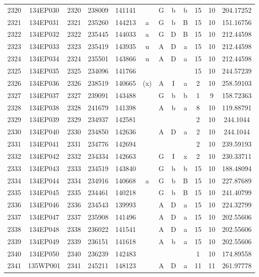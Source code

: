 \begin{tabular}{|*{12}{c|}}
2320 & 134EP030 & 2320 & 238009 & 141141 &  & G & b & b & 15 & 10 & 204.17252 \\ 
2321 & 134EP031 & 2321 & 235260 & 144213 & a & G & b & B & 15 & 10 & 151.16756 \\ 
2322 & 134EP032 & 2322 & 235445 & 144033 & a & G & D & B & 15 & 10 & 212.44598 \\ 
2323 & 134EP033 & 2323 & 235419 & 143935 & u & A & D & a & 15 & 10 & 212.44598 \\ 
2324 & 134EP034 & 2324 & 235501 & 143866 & u & A & D & a & 15 & 10 & 212.44598 \\ 
2325 & 134EP035 & 2325 & 234096 & 141766 &  &  &  &  & 15 & 10 & 244.57239 \\ 
2326 & 134EP036 & 2326 & 238519 & 140665 & (x) & A & I & a & 2 & 10 & 258.59103 \\ 
2327 & 134EP037 & 2327 & 239091 & 143488 &  & G & b & b & 1 & 9 & 158.72363 \\ 
2328 & 134EP038 & 2328 & 241679 & 141398 &  & A & b & a & 8 & 10 & 119.88791 \\ 
2329 & 134EP039 & 2329 & 234937 & 142581 &  &  &  &  & 2 & 10 & 244.1044 \\ 
2330 & 134EP040 & 2330 & 234850 & 142636 &  & A & D & a & 2 & 10 & 244.1044 \\ 
2331 & 134EP041 & 2331 & 234776 & 142694 &  &  &  &  & 2 & 10 & 239.59193 \\ 
2332 & 134EP042 & 2332 & 234334 & 142663 &  & G & I & x & 2 & 10 & 230.33711 \\ 
2333 & 134EP043 & 2333 & 234519 & 143840 &  & G & b & b & 15 & 10 & 188.48094 \\ 
2334 & 134EP044 & 2334 & 234916 & 140668 & a & G & b & B & 15 & 10 & 227.87689 \\ 
2335 & 134EP045 & 2335 & 234461 & 140218 &  & G & b & B & 15 & 10 & 241.40799 \\ 
2336 & 134EP046 & 2336 & 234543 & 139993 &  & A & D & a & 15 & 10 & 224.32799 \\ 
2337 & 134EP047 & 2337 & 235908 & 141496 &  & A & D & a & 15 & 10 & 202.55606 \\ 
2338 & 134EP048 & 2338 & 236022 & 141541 &  & A & D & a & 15 & 10 & 202.55606 \\ 
2339 & 134EP049 & 2339 & 236151 & 141618 &  & A & b & a & 15 & 10 & 202.55606 \\ 
2340 & 134EP050 & 2340 & 236239 & 142483 &  &  &  &  & 1 & 10 & 174.89558 \\ 
2341 & 135WP001 & 2341 & 245211 & 148123 &  & A & D & a & 11 & 11 & 261.97778 \\ 

\end{tabular}
